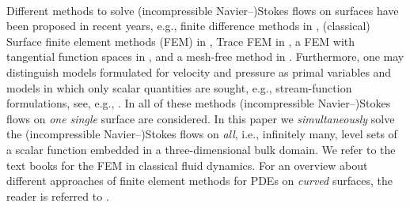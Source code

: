 \documentclass[12pt, twoside, english]{article}
\numberwithin{equation}{section}
\begin{document}
\\
Different methods to solve (incompressible Navier--)Stokes flows on surfaces have been proposed in recent years, e.g., finite difference methods in \cite{Yang_2020a}, (classical) Surface finite element methods (FEM) in \cite{Fries_2018a,Bonito_2020a}, Trace FEM in \cite{Olshanskii_2018a,Olshanskii_2019a,Olshanskii_2022a,Jankuhn_2021a}, a FEM with tangential function spaces in \cite{Demlow_2024a,Lederer_2020a}, and a mesh-free method in \cite{Suchde_2021a}. Furthermore, one may distinguish models formulated for velocity and pressure as primal variables and models in which only scalar quantities are sought, e.g., stream-function formulations, see, e.g., \cite{Brandner_2022a}. In all of these methods (incompressible Navier--)Stokes flows on \emph{one single} surface are considered. In this paper we \emph{simultaneously} solve the (incompressible Navier--)Stokes flows on \emph{all}, i.e., infinitely many, level sets of a scalar function embedded in a three-dimensional bulk domain. We refer to the text books \cite{John_2016a,Zienkiewicz_2014b,Kuzmin_2014a} for the FEM in classical fluid dynamics. For an overview about different approaches of finite element methods for PDEs on \emph{curved} surfaces, the reader is referred to \cite{Dziuk_2013a}.\\
\\
\end{document}
